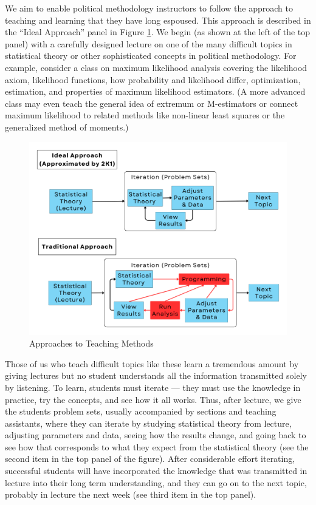 \documentclass[12pt]{article}
\theoremstyle{definition}
\begin{document}
We aim to enable political methodology instructors to follow the approach to teaching and learning that they have long espoused.  This approach is described in the ``Ideal Approach'' panel in Figure \ref{ov}.  We begin (as shown at the left of the top panel) with a carefully designed lecture on one of the many difficult topics in statistical theory or other sophisticated concepts in political methodology. For example, consider a class on maximum likelihood analysis covering the likelihood axiom, likelihood functions, how probability and likelihood differ, optimization, estimation, and properties of maximum likelihood estimators. (A more advanced class may even teach the general idea of extremum or M-estimators or connect maximum likelihood to related methods like non-linear least squares or the generalized method of moments.)
\begin{figure}[htbp]
  \begin{center}
  \includegraphics[width=\linewidth]{2}    
  \caption{\label{ov}Approaches to Teaching Methods}
  \end{center}
\end{figure}

Those of us who teach difficult topics like these learn a tremendous amount by giving lectures but no student understands all the information transmitted solely by listening. To learn, students must iterate --- they must use the knowledge in practice, try the concepts, and see how it all works. Thus, after lecture, we give the students problem sets, usually accompanied by sections and teaching assistants, where they can iterate by studying statistical theory from lecture, adjusting parameters and data, seeing how the results change, and going back to see how that corresponds to what they expect from the statistical theory (see the second item in the top panel of the figure).  After considerable effort iterating, successful students will have incorporated the knowledge that was transmitted in lecture into their long term understanding, and they can go on to the next topic, probably in lecture the next week (see third item in the top panel).
\end{document}
